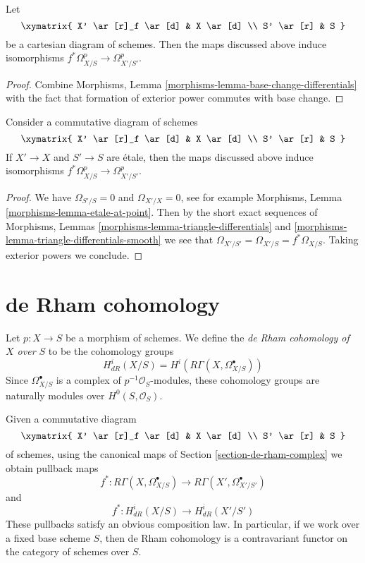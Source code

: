 \begin{lemma}
\label{lemma-base-change-de-rham}
Let
$$
\xymatrix{
X' \ar[r]_f \ar[d] & X \ar[d] \\
S' \ar[r] & S
}
$$
be a cartesian diagram of schemes. Then the maps discussed
above induce isomorphisms
$f^*\Omega^p_{X/S} \to \Omega^p_{X'/S'}$.
\end{lemma}

\begin{proof}
Combine Morphisms, Lemma \ref{morphisms-lemma-base-change-differentials}
with the fact that formation of exterior power commutes with base change.
\end{proof}

\begin{lemma}
\label{lemma-etale}
Consider a commutative diagram of schemes
$$
\xymatrix{
X' \ar[r]_f \ar[d] & X \ar[d] \\
S' \ar[r] & S
}
$$
If $X' \to X$ and $S' \to S$ are \'etale, then the maps discussed
above induce isomorphisms
$f^*\Omega^p_{X/S} \to \Omega^p_{X'/S'}$.
\end{lemma}

\begin{proof}
We have $\Omega_{S'/S} = 0$ and $\Omega_{X'/X} = 0$, see for example
Morphisms, Lemma \ref{morphisms-lemma-etale-at-point}. Then by
the short exact sequences of Morphisms, Lemmas
\ref{morphisms-lemma-triangle-differentials} and
\ref{morphisms-lemma-triangle-differentials-smooth}
we see that $\Omega_{X'/S'} = \Omega_{X'/S} = f^*\Omega_{X/S}$.
Taking exterior powers we conclude.
\end{proof}






\section{de Rham cohomology}
\label{section-de-rham-cohomology}

\noindent
Let $p : X \to S$ be a morphism of schemes. We define the
{\it de Rham cohomology of $X$ over $S$} to be the cohomology
groups
$$
H^i_{dR}(X/S) = H^i(R\Gamma(X, \Omega^\bullet_{X/S}))
$$
Since $\Omega^\bullet_{X/S}$ is a complex of $p^{-1}\mathcal{O}_S$-modules,
these cohomology groups are naturally modules over $H^0(S, \mathcal{O}_S)$.

\medskip\noindent
Given a commutative diagram
$$
\xymatrix{
X' \ar[r]_f \ar[d] & X \ar[d] \\
S' \ar[r] & S
}
$$
of schemes, using the canonical maps of Section \ref{section-de-rham-complex}
we obtain pullback maps
$$
f^* :
R\Gamma(X, \Omega^\bullet_{X/S})
\longrightarrow
R\Gamma(X', \Omega^\bullet_{X'/S'})
$$
and
$$
f^* : H^i_{dR}(X/S) \longrightarrow H^i_{dR}(X'/S')
$$
These pullbacks satisfy an obvious composition law.
In particular, if we work over a fixed base scheme $S$, then de Rham
cohomology is a contravariant functor on the category of schemes over $S$.

